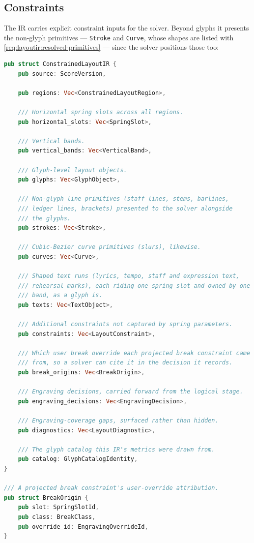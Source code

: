 \documentclass[11pt,letterpaper]{report}
\begin{document}
\subsection{Constraints}

The IR carries explicit constraint inputs for the solver. Beyond
glyphs it presents the non-glyph primitives --- \texttt{Stroke} and
\texttt{Curve}, whose shapes are listed with
\ref{req:layoutir:resolved-primitives} --- since the solver positions
those too:

\begin{lstlisting}[language=Rust]
pub struct ConstrainedLayoutIR {
    pub source: ScoreVersion,

    pub regions: Vec<ConstrainedLayoutRegion>,

    /// Horizontal spring slots across all regions.
    pub horizontal_slots: Vec<SpringSlot>,

    /// Vertical bands.
    pub vertical_bands: Vec<VerticalBand>,

    /// Glyph-level layout objects.
    pub glyphs: Vec<GlyphObject>,

    /// Non-glyph line primitives (staff lines, stems, barlines,
    /// ledger lines, brackets) presented to the solver alongside
    /// the glyphs.
    pub strokes: Vec<Stroke>,

    /// Cubic-Bezier curve primitives (slurs), likewise.
    pub curves: Vec<Curve>,

    /// Shaped text runs (lyrics, tempo, staff and expression text,
    /// rehearsal marks), each riding one spring slot and owned by one
    /// band, as a glyph is.
    pub texts: Vec<TextObject>,

    /// Additional constraints not captured by spring parameters.
    pub constraints: Vec<LayoutConstraint>,

    /// Which user break override each projected break constraint came
    /// from, so a solver can cite it in the decision it records.
    pub break_origins: Vec<BreakOrigin>,

    /// Engraving decisions, carried forward from the logical stage.
    pub engraving_decisions: Vec<EngravingDecision>,

    /// Engraving-coverage gaps, surfaced rather than hidden.
    pub diagnostics: Vec<LayoutDiagnostic>,

    /// The glyph catalog this IR's metrics were drawn from.
    pub catalog: GlyphCatalogIdentity,
}

/// A projected break constraint's user-override attribution.
pub struct BreakOrigin {
    pub slot: SpringSlotId,
    pub class: BreakClass,
    pub override_id: EngravingOverrideId,
}


\end{lstlisting}
\end{document}
